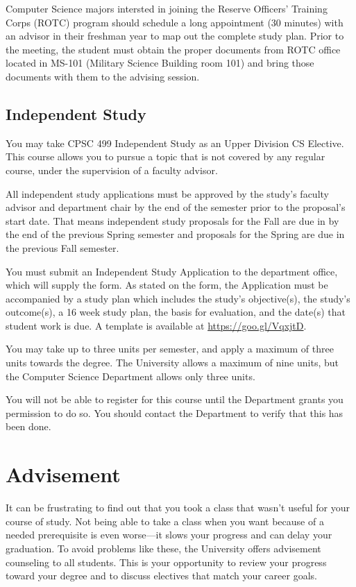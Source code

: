 \documentclass{book}
\begin{document}
Computer Science majors intersted in joining the Reserve Officers' Training
Corps (ROTC) program should schedule a long appointment (30 minutes) with an
advisor in their freshman year to map out the complete study plan.  Prior to
the meeting, the student must obtain the proper documents from ROTC office
located in MS-101 (Military Science Building room 101) and bring those
documents with them to the advising session.

\section{Independent Study}

You may take CPSC 499 Independent Study as an Upper Division CS Elective. This course allows you to pursue a topic that is not covered by any regular course, under the supervision of a faculty advisor.

All independent study applications must be approved by the study's faculty advisor and department chair by the
end of the semester prior to the proposal’s start date. That means independent study proposals for the Fall are due in
by the end of the previous Spring semester and proposals for the Spring are due in the previous Fall semester.

You must submit an Independent Study Application to the department office, which will supply the form. As stated on the form, the Application must be accompanied by a study plan which includes the study's objective(s), the study's outcome(s), a 16 week study plan, the basis for evaluation, and the date(s) that student work is due. A template is available at \url{https://goo.gl/VqxjtD}.

You may take up to three units per semester, and apply a maximum of three units towards the degree. The University allows a maximum of nine units, but the Computer Science Department allows only three units.

You will not be able to register for this course until the Department grants you permission to do so. You should contact the Department to verify that this has been done.

\chapter{Advisement}

It can be frustrating to find out that you took a class that wasn't useful for your course of study. Not being able to take a class when you want because of a needed prerequisite is even worse---it slows your progress and can delay your graduation. To avoid problems like these, the University offers advisement counseling to all students. This is your opportunity to review your progress toward your degree and to discuss electives that match your career goals.
\end{document}
